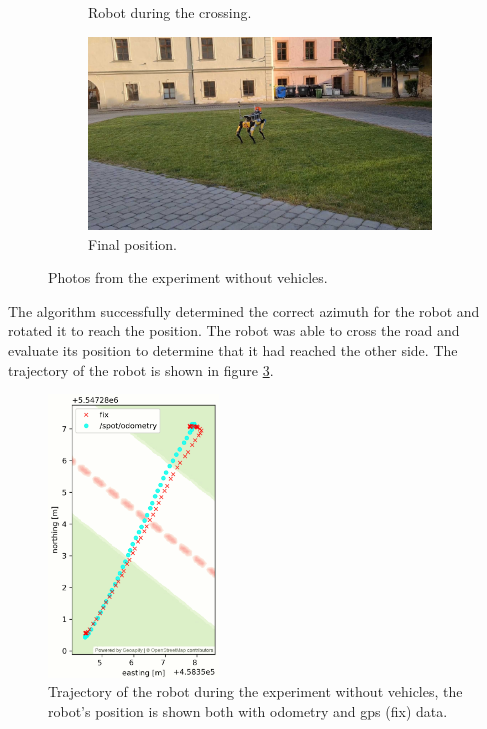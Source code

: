 \begin{figure}[ht]
\begin{subfigure}{0.49\textwidth}
                    \caption{Robot during the crossing.}
                \end{subfigure}
                \begin{subfigure}{0.49\textwidth}
                    \includegraphics[width=\textwidth]{images/final1.jpg}
                    \caption{Final position.}
                    \label{fig:final1}
                \end{subfigure}
                \caption{Photos from the experiment without vehicles.}
            \end{figure}
            The algorithm successfully determined the correct azimuth for the robot and rotated it to reach the position. The robot was able to cross the road and evaluate its position to determine that it had reached the other side. The trajectory of the robot is shown in figure \ref{fig:trajectory1}.
            \begin{figure}[H]
                \centering
                \includegraphics[height=7.5cm]{images/real_trajectory.png}
                \caption{Trajectory of the robot during the experiment without vehicles, the robot's position is shown both with odometry and gps (fix) data.}
                \label{fig:trajectory1}
            \end{figure}

